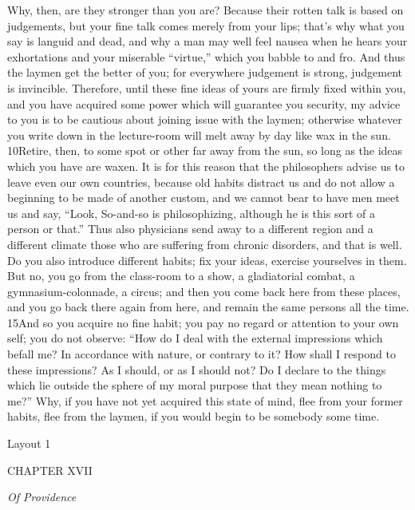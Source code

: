 Why, then, are they stronger than you are? Because their rotten talk is based on judgements, but your fine talk comes merely from your lips; that's why what you say is languid and dead, and why a man may well feel nausea when he hears your exhortations and your miserable ``virtue,'' which you babble to and fro. And thus the laymen get the better of you; for everywhere judgement is strong, judgement is invincible. Therefore, until these fine ideas of yours are firmly fixed within you, and you have acquired some power which will guarantee you security, my advice to you is to be cautious about joining issue with the laymen; otherwise whatever you write down in the lecture-room will melt away by day like wax in the sun. 10Retire, then, to some spot or other far away from the sun, so long as the ideas which you have are waxen. It is for this reason that the philosophers advise us to leave even our own countries, because old habits distract us and do not allow a beginning to be made of another custom, and we cannot bear to have men meet us and say, ``Look, So-and-so is philosophizing, although he is this sort of a person or that.'' Thus also physicians send away to a different region and a different climate those who are suffering from chronic disorders, and that is well. Do you also introduce different habits; fix your ideas, exercise yourselves in them. But no, you go from the class-room to a show, a gladiatorial combat, a gymnasium-colonnade, a circus; and then you come back here from these places, and you go back there again from here, and remain the same persons all the time. 15And so you acquire no fine habit; you pay no regard or attention to your own self; you do not observe: ``How do I deal with the external impressions which befall me? In accordance with nature, or contrary to it? How shall I respond to these impressions? As I should, or as I should not? Do I declare to the things which lie outside the sphere of my moral purpose that they mean nothing to me?'' Why, if you have not yet acquired this state of mind, flee from your former habits, flee from the laymen, if you would begin to be somebody some time.



Layout 1

CHAPTER XVII

\emph{Of Providence}

